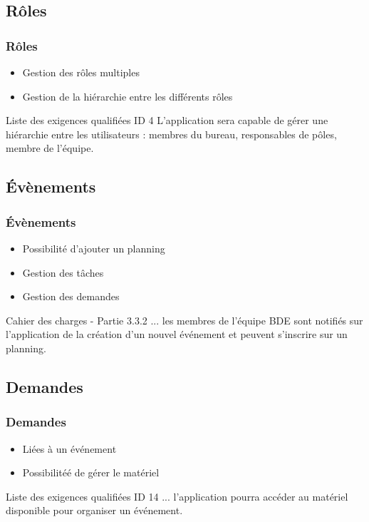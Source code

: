 \documentclass[handout]{beamer}
\begin{document}
	\subsection{Rôles}
	\begin{frame}
		\frametitle{Rôles}

		\begin{itemize}
			\item Gestion des rôles multiples
			\item Gestion de la hiérarchie entre les différents rôles
		\end{itemize}

		\begin{exampleblock}{Liste des exigences qualifiées ID 4}
			L'application sera capable de gérer une hiérarchie entre les utilisateurs : membres du bureau, responsables de pôles, membre de l'équipe.
		\end{exampleblock}
	\end{frame}

	\subsection{Évènements}
	\begin{frame}
		\frametitle{Évènements}

		\begin{itemize}
			\item Possibilité d'ajouter un planning
			\item Gestion des tâches
			\item Gestion des demandes
		\end{itemize}

		\begin{exampleblock}{Cahier des charges - Partie 3.3.2}
			... les membres de l'équipe BDE sont notifiés sur l'application de la création d'un nouvel événement et peuvent s'inscrire sur un planning.
		\end{exampleblock}
	\end{frame}

	\subsection{Demandes}
	\begin{frame}
		\frametitle{Demandes}

		\begin{itemize}
			\item Liées à un événement
			\item Possibilitéé de gérer le matériel
		\end{itemize}

		\begin{exampleblock}{Liste des exigences qualifiées  ID 14}
			... l'application pourra accéder au matériel disponible pour organiser un événement.
		\end{exampleblock}
	\end{frame}

\end{document}

